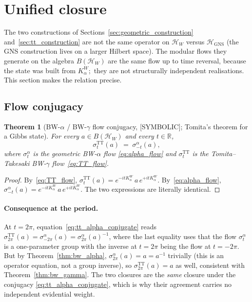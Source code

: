 \documentclass[11pt,a4paper]{article}
\theoremstyle{plain}
\newtheorem{theorem}{Theorem}[section]
\theoremstyle{definition}
\newcommand{\Hilb}{\mathcal{H}}
\newcommand{\R}{\mathbb{R}}
\newcommand{\TT}{\mathrm{TT}}
\newcommand{\GNS}{\mathrm{GNS}}
\begin{document}
\section{Unified closure}\label{sec:unified_closure}

The two constructions of Sections~\ref{sec:geometric_construction}
and~\ref{sec:tt_construction} are not the same operator on
$\Hilb_W$ versus $\Hilb_{\GNS}$ (the GNS construction lives on a
larger Hilbert space). The modular flows they generate on the
algebra $B(\Hilb_W)$ are the same flow up to time reversal, because
the state was built from $K_\alpha^W$;\ they are not structurally
independent realisations.  This section makes the relation precise.

\subsection{Flow conjugacy}\label{sec:flow_conjugacy}

\begin{theorem}[BW-$\alpha$ / BW-$\gamma$ flow conjugacy, {[SYMBOLIC]};
Tomita's theorem for a Gibbs state]
\label{thm:unified}
For every $a \in B(\Hilb_W)$ and every $t \in \R$,
\begin{equation}\label{eq:tt_alpha_conjugate}
   \sigma_t^{\TT}(a) \;=\; \sigma_{-t}^{\alpha}(a),
\end{equation}
where $\sigma_t^{\alpha}$ is the geometric BW-$\alpha$ flow
\eqref{eq:alpha_flow} and $\sigma_t^{\TT}$ is the Tomita--Takesaki
BW-$\gamma$ flow~\eqref{eq:TT_flow}.
\end{theorem}

\begin{proof}
By~\eqref{eq:TT_flow}, $\sigma_t^{\TT}(a) = e^{-it K_\alpha^W}\, a\,
e^{+it K_\alpha^W}$. By~\eqref{eq:alpha_flow}, $\sigma_{-t}^{\alpha}(a) =
e^{-it K_\alpha^W}\, a\, e^{+it K_\alpha^W}$. The two expressions are
literally identical.
\end{proof}

\paragraph{Consequence at the period.}
At $t = 2\pi$, equation~\eqref{eq:tt_alpha_conjugate} reads
$\sigma_{2\pi}^{\TT}(a) = \sigma_{-2\pi}^{\alpha}(a) =
\sigma_{2\pi}^{\alpha}(a)^{-1}$, where the last equality uses that the
flow $\sigma_t^{\alpha}$ is a one-parameter group with the inverse at
$t = 2\pi$ being the flow at $t = -2\pi$. But by
Theorem~\ref{thm:bw_alpha}, $\sigma_{2\pi}^{\alpha}(a) = a = a^{-1}$
trivially (this is an operator equation, not a group inverse), so
$\sigma_{2\pi}^{\TT}(a) = a$ as well, consistent with
Theorem~\ref{thm:bw_gamma}. The two closures are the \emph{same}
closure under the conjugacy \eqref{eq:tt_alpha_conjugate}, which is
why their agreement carries no independent evidential weight.
\end{document}

